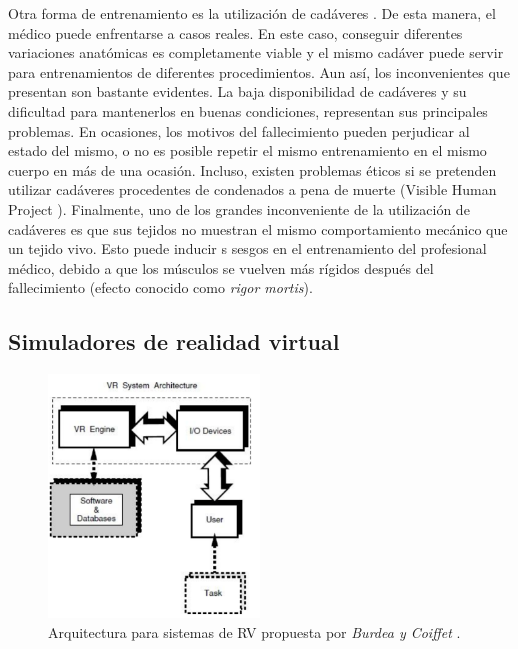 Otra forma de entrenamiento es la utilización de cadáveres \cite{Tsui2007}. De esta manera, el médico puede enfrentarse a casos reales. En este caso, conseguir diferentes variaciones anatómicas es completamente viable y el mismo cadáver puede servir para entrenamientos de diferentes procedimientos. Aun así, los inconvenientes que presentan son bastante evidentes. 
La baja disponibilidad de cadáveres y su dificultad para mantenerlos en buenas condiciones, representan sus principales problemas. En ocasiones, los motivos del fallecimiento pueden perjudicar al estado del mismo, o no es posible repetir el mismo entrenamiento en el mismo cuerpo en más de una ocasión. Incluso, existen problemas éticos si se pretenden utilizar cadáveres procedentes de condenados a pena de muerte (Visible Human Project \cite{ackerman1998visible}).
Finalmente, uno de los grandes inconveniente de la utilización de cadáveres es que sus tejidos no muestran el mismo comportamiento mecánico que un tejido vivo. Esto puede inducir s sesgos en el entrenamiento del profesional médico, debido a que los músculos se vuelven más rígidos después del fallecimiento (efecto conocido como \emph{rigor mortis}).

\subsection{Simuladores de realidad virtual}
\label{art:simulador}

\begin{figure}[ht]
   \centering
    \includegraphics[width=0.5\textwidth]{IMG/VRarq.PNG}
    \caption{Arquitectura para sistemas de \acs{RV} propuesta por \emph{Burdea y Coiffet} \cite{burdea2003virtual}. }
   \label{fig:RVarq}
\end{figure}

